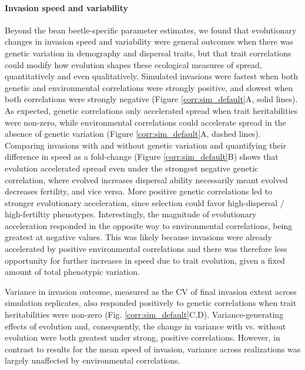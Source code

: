 \documentclass[11pt]{article}
\begin{document}
\paragraph{Invasion speed and variability}
Beyond the bean beetle-specific parameter estimates, we found that evolutionary changes in invasion speed and variability were general outcomes when there was genetic variation in demography and dispersal traits, but that trait correlations could modify how evolution shapes these ecological measures of spread, quantitatively and even qualitatively.
Simulated invasions were fastest when both genetic and environmental correlations were strongly positive, and slowest when both correlations were strongly negative (Figure \ref{corr:sim_default}A, solid lines).
As expected, genetic correlations only accelerated spread when trait heritabilities were non-zero, while environmental correlations could accelerate spread in the absence of genetic variation (Figure \ref{corr:sim_default}A, dashed lines).
Comparing invasions with and without genetic variation and quantifying their difference in speed as a fold-change (Figure \ref{corr:sim_default}B) shows that evolution accelerated spread even under the strongest negative genetic correlation, where evolved increases dispersal ability necessarily meant evolved decreases fertility, and vice versa.
More positive genetic correlations led to stronger evolutionary acceleration, since selection could favor high-dispersal / high-fertiltiy phenotypes.
Interestingly, the magnitude of evolutionary acceleration responded in the opposite way to environmental correlations, being greatest at negative values.
This was likely because invasions were already accelerated by positive environmental correlations and there was therefore less opportunity for further increases in speed due to trait evolution, given a fixed amount of total phenotypic variation.

Variance in invasion outcome, measured as the CV of final invasion extent across simulation replicates, also responded positively to genetic correlations when trait heritabilities were non-zero (Fig. \ref{corr:sim_default}C,D).
Variance-generating effects of evolution and, consequently, the change in variance with vs. without evolution were both greatest under strong, positive correlations.
However, in contrast to results for the mean speed of invasion, variance across realizations was largely unaffected by environmental correlations.
\end{document}
